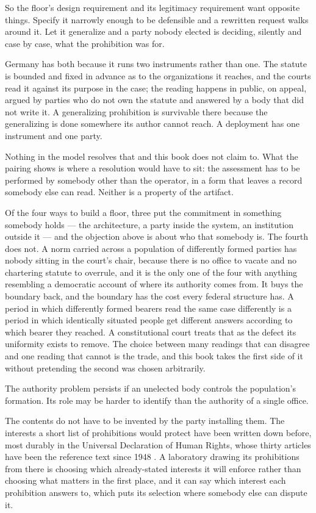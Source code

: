 So the floor's design requirement and its legitimacy requirement want opposite things. Specify it narrowly enough to be defensible and a rewritten request walks around it. Let it generalize and a party nobody elected is deciding, silently and case by case, what the prohibition was for.

Germany has both because it runs two instruments rather than one. The statute is bounded and fixed in advance as to the organizations it reaches, and the courts read it against its purpose in the case; the reading happens in public, on appeal, argued by parties who do not own the statute and answered by a body that did not write it. A generalizing prohibition is survivable there because the generalizing is done somewhere its author cannot reach. A deployment has one instrument and one party.

Nothing in the model resolves that and this book does not claim to. What the pairing shows is where a resolution would have to sit: the assessment has to be performed by somebody other than the operator, in a form that leaves a record somebody else can read. Neither is a property of the artifact.

Of the four ways to build a floor, three put the commitment in something somebody holds — the architecture, a party inside the system, an institution outside it — and the objection above is about who that somebody is. The fourth does not. A norm carried across a population of differently formed parties has nobody sitting in the court's chair, because there is no office to vacate and no chartering statute to overrule, and it is the only one of the four with anything resembling a democratic account of where its authority comes from. It buys the boundary back, and the boundary has the cost every federal structure has. A period in which differently formed bearers read the same case differently is a period in which identically situated people get different answers according to which bearer they reached. A constitutional court treats that as the defect its uniformity exists to remove. The choice between many readings that can disagree and one reading that cannot is the trade, and this book takes the first side of it without pretending the second was chosen arbitrarily.

The authority problem persists if an unelected body controls the population's formation. Its role may be harder to identify than the authority of a single office.

The contents do not have to be invented by the party installing them. The interests a short list of prohibitions would protect have been written down before, most durably in the Universal Declaration of Human Rights, whose thirty articles have been the reference text since 1948 \autocite{un1948udhr}. A laboratory drawing its prohibitions from there is choosing which already-stated interests it will enforce rather than choosing what matters in the first place, and it can say which interest each prohibition answers to, which puts its selection where somebody else can dispute it.


